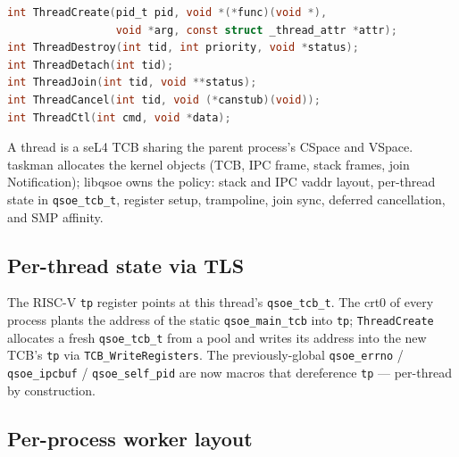 \begin{lstlisting}[language=C]
int ThreadCreate(pid_t pid, void *(*func)(void *),
                 void *arg, const struct _thread_attr *attr);
int ThreadDestroy(int tid, int priority, void *status);
int ThreadDetach(int tid);
int ThreadJoin(int tid, void **status);
int ThreadCancel(int tid, void (*canstub)(void));
int ThreadCtl(int cmd, void *data);
\end{lstlisting}

A thread is a seL4 TCB sharing the parent process's CSpace and VSpace.
taskman allocates the kernel objects (TCB, IPC frame, stack frames,
join Notification); libqsoe owns the policy: stack and IPC vaddr
layout, per-thread state in \texttt{qsoe\_tcb\_t}, register setup,
trampoline, join sync, deferred cancellation, and SMP affinity.

\subsection{Per-thread state via TLS}

The RISC-V \texttt{tp} register points at this thread's
\texttt{qsoe\_tcb\_t}.  The crt0 of every process plants the address
of the static \texttt{qsoe\_main\_tcb} into \texttt{tp};
\texttt{ThreadCreate} allocates a fresh \texttt{qsoe\_tcb\_t} from a
pool and writes its address into the new TCB's \texttt{tp} via
\texttt{TCB\_WriteRegisters}.  The previously-global
\texttt{qsoe\_errno} / \texttt{qsoe\_ipcbuf} / \texttt{qsoe\_self\_pid}
are now macros that dereference \texttt{tp} --- per-thread by
construction.

\subsection{Per-process worker layout}

